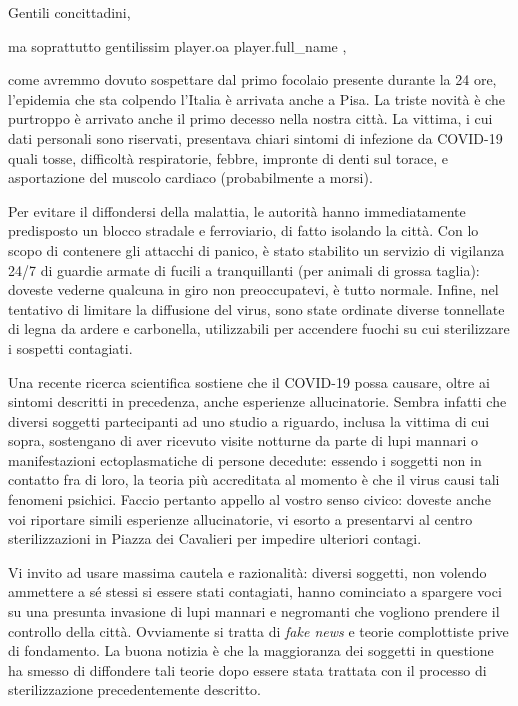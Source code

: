 \documentclass{letter}
\date{1 marzo 2020}
\begin{document}
\begin{letter}{}
\opening{Gentili concittadini,}

ma soprattutto gentilissim{{ player.oa }} {{ player.full_name }},

come avremmo dovuto sospettare dal primo focolaio presente durante la 24 ore, l'epidemia che sta colpendo l'Italia è arrivata anche a Pisa. La triste novità è che purtroppo è arrivato anche il primo decesso nella nostra città. La vittima, i cui dati personali sono riservati, presentava chiari sintomi di infezione da COVID-19 quali tosse, difficoltà respiratorie, febbre, impronte di denti sul torace, e asportazione del muscolo cardiaco (probabilmente a morsi).

Per evitare il diffondersi della malattia, le autorità hanno immediatamente predisposto un blocco stradale e ferroviario, di fatto isolando la città. Con lo scopo di contenere gli attacchi di panico, è stato stabilito un servizio di vigilanza 24/7 di guardie armate di fucili a tranquillanti (per animali di grossa taglia): doveste vederne qualcuna in giro non preoccupatevi, è tutto normale. Infine, nel tentativo di limitare la diffusione del virus, sono state ordinate diverse tonnellate di legna da ardere e carbonella, utilizzabili per accendere fuochi su cui sterilizzare i sospetti contagiati.

Una recente ricerca scientifica sostiene che il COVID-19 possa causare, oltre ai sintomi descritti in precedenza, anche esperienze allucinatorie. Sembra infatti che diversi soggetti partecipanti ad uno studio a riguardo, inclusa la vittima di cui sopra, sostengano di aver ricevuto visite notturne da parte di lupi mannari o manifestazioni ectoplasmatiche di persone decedute: essendo i soggetti non in contatto fra di loro, la teoria più accreditata al momento è che il virus causi tali fenomeni psichici. Faccio pertanto appello al vostro senso civico: doveste anche voi riportare simili esperienze allucinatorie, vi esorto a presentarvi al centro sterilizzazioni in Piazza dei Cavalieri per impedire ulteriori contagi.

Vi invito ad usare massima cautela e razionalità: diversi soggetti, non volendo ammettere a sé stessi si essere stati contagiati, hanno cominciato a spargere voci su una presunta invasione di lupi mannari e negromanti che vogliono prendere il controllo della città. Ovviamente si tratta di \emph{fake news} e teorie complottiste prive di fondamento. La buona notizia è che la maggioranza dei soggetti in questione ha smesso di diffondere tali teorie dopo essere stata trattata con il processo di sterilizzazione precedentemente descritto.


\end{letter}
\end{document}
